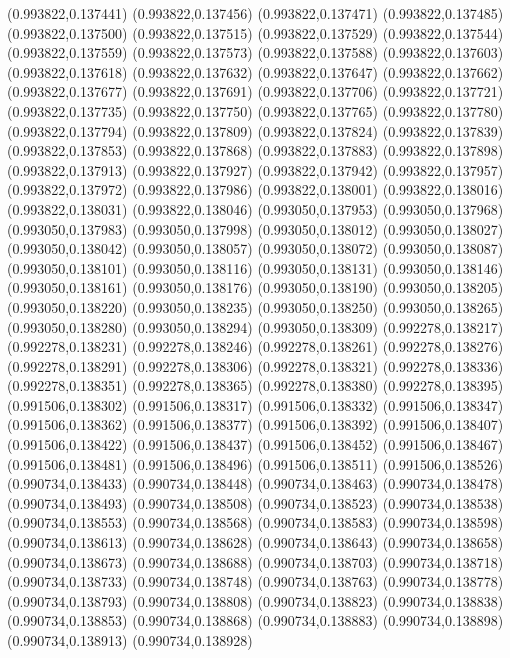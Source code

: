 (0.993822,0.137441)
(0.993822,0.137456)
(0.993822,0.137471)
(0.993822,0.137485)
(0.993822,0.137500)
(0.993822,0.137515)
(0.993822,0.137529)
(0.993822,0.137544)
(0.993822,0.137559)
(0.993822,0.137573)
(0.993822,0.137588)
(0.993822,0.137603)
(0.993822,0.137618)
(0.993822,0.137632)
(0.993822,0.137647)
(0.993822,0.137662)
(0.993822,0.137677)
(0.993822,0.137691)
(0.993822,0.137706)
(0.993822,0.137721)
(0.993822,0.137735)
(0.993822,0.137750)
(0.993822,0.137765)
(0.993822,0.137780)
(0.993822,0.137794)
(0.993822,0.137809)
(0.993822,0.137824)
(0.993822,0.137839)
(0.993822,0.137853)
(0.993822,0.137868)
(0.993822,0.137883)
(0.993822,0.137898)
(0.993822,0.137913)
(0.993822,0.137927)
(0.993822,0.137942)
(0.993822,0.137957)
(0.993822,0.137972)
(0.993822,0.137986)
(0.993822,0.138001)
(0.993822,0.138016)
(0.993822,0.138031)
(0.993822,0.138046)
(0.993050,0.137953)
(0.993050,0.137968)
(0.993050,0.137983)
(0.993050,0.137998)
(0.993050,0.138012)
(0.993050,0.138027)
(0.993050,0.138042)
(0.993050,0.138057)
(0.993050,0.138072)
(0.993050,0.138087)
(0.993050,0.138101)
(0.993050,0.138116)
(0.993050,0.138131)
(0.993050,0.138146)
(0.993050,0.138161)
(0.993050,0.138176)
(0.993050,0.138190)
(0.993050,0.138205)
(0.993050,0.138220)
(0.993050,0.138235)
(0.993050,0.138250)
(0.993050,0.138265)
(0.993050,0.138280)
(0.993050,0.138294)
(0.993050,0.138309)
(0.992278,0.138217)
(0.992278,0.138231)
(0.992278,0.138246)
(0.992278,0.138261)
(0.992278,0.138276)
(0.992278,0.138291)
(0.992278,0.138306)
(0.992278,0.138321)
(0.992278,0.138336)
(0.992278,0.138351)
(0.992278,0.138365)
(0.992278,0.138380)
(0.992278,0.138395)
(0.991506,0.138302)
(0.991506,0.138317)
(0.991506,0.138332)
(0.991506,0.138347)
(0.991506,0.138362)
(0.991506,0.138377)
(0.991506,0.138392)
(0.991506,0.138407)
(0.991506,0.138422)
(0.991506,0.138437)
(0.991506,0.138452)
(0.991506,0.138467)
(0.991506,0.138481)
(0.991506,0.138496)
(0.991506,0.138511)
(0.991506,0.138526)
(0.990734,0.138433)
(0.990734,0.138448)
(0.990734,0.138463)
(0.990734,0.138478)
(0.990734,0.138493)
(0.990734,0.138508)
(0.990734,0.138523)
(0.990734,0.138538)
(0.990734,0.138553)
(0.990734,0.138568)
(0.990734,0.138583)
(0.990734,0.138598)
(0.990734,0.138613)
(0.990734,0.138628)
(0.990734,0.138643)
(0.990734,0.138658)
(0.990734,0.138673)
(0.990734,0.138688)
(0.990734,0.138703)
(0.990734,0.138718)
(0.990734,0.138733)
(0.990734,0.138748)
(0.990734,0.138763)
(0.990734,0.138778)
(0.990734,0.138793)
(0.990734,0.138808)
(0.990734,0.138823)
(0.990734,0.138838)
(0.990734,0.138853)
(0.990734,0.138868)
(0.990734,0.138883)
(0.990734,0.138898)
(0.990734,0.138913)
(0.990734,0.138928)

